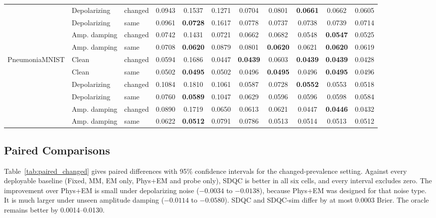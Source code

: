 \documentclass[conference]{IEEEtran}
\begin{document}
\begin{table}[t]
\begin{adjustbox}{max width=\linewidth}
\begin{tabular}{lllcccccccc}
 & Depolarizing & changed & 0.0943 & 0.1537 & 0.1271 & 0.0704 & 0.0801 & \textbf{0.0661} & 0.0662 & 0.0605 \\
 & Depolarizing & same    & 0.0961 & \textbf{0.0728} & 0.1617 & 0.0778 & 0.0737 & 0.0738 & 0.0739 & 0.0714 \\
 & Amp. damping & changed & 0.0742 & 0.1431 & 0.0721 & 0.0662 & 0.0682 & 0.0548 & \textbf{0.0547} & 0.0525 \\
 & Amp. damping & same    & 0.0708 & \textbf{0.0620} & 0.0879 & 0.0801 & \textbf{0.0620} & 0.0621 & \textbf{0.0620} & 0.0619 \\
\midrule
\multirow{6}{*}{PneumoniaMNIST}
 & Clean        & changed & 0.0594 & 0.1686 & 0.0447 & \textbf{0.0439} & 0.0603 & \textbf{0.0439} & \textbf{0.0439} & 0.0428 \\
 & Clean        & same    & 0.0502 & \textbf{0.0495} & 0.0502 & 0.0496 & \textbf{0.0495} & 0.0496 & \textbf{0.0495} & 0.0496 \\
 & Depolarizing & changed & 0.1084 & 0.1810 & 0.1061 & 0.0587 & 0.0728 & \textbf{0.0552} & 0.0553 & 0.0518 \\
 & Depolarizing & same    & 0.0760 & \textbf{0.0589} & 0.1047 & 0.0629 & 0.0596 & 0.0596 & 0.0598 & 0.0584 \\
 & Amp. damping & changed & 0.0890 & 0.1719 & 0.0650 & 0.0613 & 0.0621 & 0.0447 & \textbf{0.0446} & 0.0432 \\
 & Amp. damping & same    & 0.0622 & \textbf{0.0512} & 0.0791 & 0.0786 & 0.0513 & 0.0514 & 0.0513 & 0.0512 \\
\bottomrule
\end{tabular}
\end{adjustbox}
\end{table}

\subsection{Paired Comparisons}

Table~\ref{tab:paired_changed} gives paired differences with 95\% confidence intervals for the changed-prevalence setting. Against every deployable baseline (Fixed, MM, EM only, Phys+EM and probe only), SDQC is better in all six cells, and every interval excludes zero. The improvement over Phys+EM is small under depolarizing noise ($-0.0034$ to $-0.0138$), because Phys+EM was designed for that noise type. It is much larger under unseen amplitude damping ($-0.0114$ to $-0.0580$). SDQC and SDQC-sim differ by at most 0.0003 Brier. The oracle remains better by 0.0014--0.0130.
\end{document}

